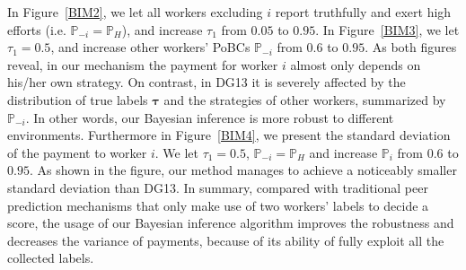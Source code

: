 In Figure~\ref{BIM2}, we let all workers excluding $i$ report truthfully and exert high efforts (i.e. $\mathbb{P}_{-i} = \mathbb{P}_H$), 
and increase $\tau_1$ from $0.05$ to $0.95$.
In Figure~\ref{BIM3}, we let $\tau_1=0.5$, and increase other workers' PoBCs $\mathbb{P}_{-i}$ from $0.6$ to $0.95$.
As both figures reveal, in our mechanism the payment for worker $i$ almost only depends on his/her own strategy. On contrast, in DG13 it is severely affected by the distribution of true labels $\bm{\tau}$ and the strategies of other workers, summarized by $\mathbb{P}_{-i}$.
In other words, our Bayesian inference is more robust to different environments.
Furthermore in Figure~\ref{BIM4}, we present the standard deviation of the payment to worker $i$.
We let $\tau_1=0.5$, $\mathbb{P}_{-i}=\mathbb{P}_H$ and increase $\mathbb{P}_i$ from $0.6$ to $0.95$.
As shown in the figure, our method manages to achieve a noticeably smaller standard deviation than DG13. 
In summary, compared with traditional peer prediction mechanisms that only make use of two workers' labels to decide a score, the usage of our Bayesian inference algorithm improves the robustness and decreases the variance of payments, because of its ability of fully exploit all the collected labels. %



